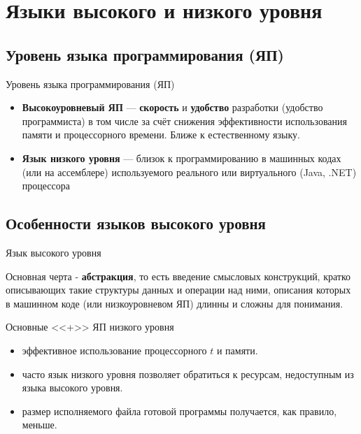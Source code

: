 \section{Языки высокого и низкого уровня}
\subsection{Уровень языка программирования (ЯП)}

\begin{frame}[t]{Уровень языка программирования (ЯП)}
  \begin{itemize}
    \item \textbf{Высокоуровневый ЯП} --- \textbf{скорость} и \textbf{удобство} разработки (удобство программиста) в том числе за счёт снижения 
    эффективности использования памяти и процессорного времени. 
    Ближе к естественному языку.

    \item \textbf{Язык низкого уровня} --- близок к программированию в машинных кодах (или на ассемблере)
      используемого реального или виртуального (Java, .NET) процессора
  \end{itemize}
\end{frame}

\subsection{Особенности языков высокого уровня}

\begin{frame}[t]{Язык высокого уровня}

   Основная черта - \textbf{абстракция}, то есть введение смысловых конструкций, 
   кратко описывающих такие структуры данных и операции над ними, 
   описания которых в машинном коде (или низкоуровневом ЯП) длинны и сложны для понимания.

\end{frame}

\begin{frame}[t]{Основные <<+>> ЯП низкого уровня}
  \begin{itemize}
    \item эффективное использование процессорного $t$ и памяти.
    \item часто язык низкого уровня позволяет обратиться к ресурсам, недоступным из языка высокого уровня.
    \item размер исполняемого файла готовой программы получается, как правило, меньше.
  \end{itemize}
\end{frame}


